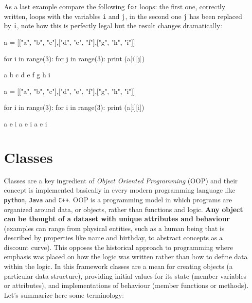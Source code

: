 As a last example compare the following \texttt{for} loops: the first one, correctly written, 
loops with the variables \texttt{i} and \texttt{j}, in the second one \texttt{j} has been 
replaced by \texttt{i}, note how this is perfectly legal but the result changes dramatically:

\begin{ipython}
a = [["a", "b", "c"],["d", "e", "f"],["g", "h", "i"]]

for i in range(3):
    for j in range(3):
        print (a[i][j])
\end{ipython}
\begin{ioutput} 	  
a
b
c
d
e
f
g
h
i
\end{ioutput}

\begin{ipython}
a = [["a", "b", "c"],["d", "e", "f"],["g", "h", "i"]]

for i in range(3):
    for i in range(3):
        print (a[i][i])
\end{ipython}
\begin{ioutput} 	  
a
e
i
a
e
i
a
e
i
\end{ioutput}

\section{Classes}\label{classes}

Classes are a key ingredient of \emph{Object Oriented Programming} (OOP) and their concept is 
implemented basically in every modern programming language like \texttt{python}, \texttt{Java} and 
\texttt{C++}. OOP is a programming model in which programs are organized around data, or objects, 
rather than functions and logic.
\textbf{Any object can be thought of a dataset with unique attributes and behaviour} 
(examples can range from physical entities, such as a human being that is described by properties 
like name and birthday, to abstract concepts as a discount curve). This opposes the historical 
approach to programming where emphasis was placed on how the logic was written rather than how to 
define data within the logic. In this framework classes are a mean for creating objects 
(a particular data structure), providing initial values for its state (member variables or attributes), 
and implementations of behaviour (member functions or methods).
Let's summarize here some terminology:

